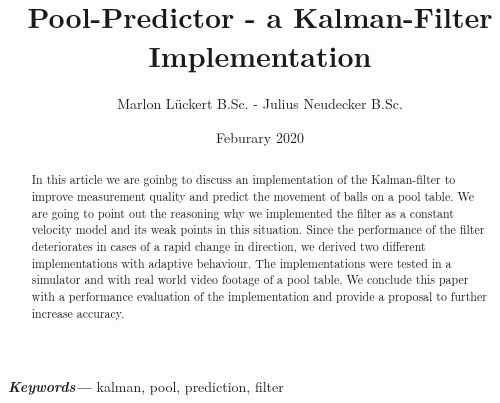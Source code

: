 \documentclass[notitlepage, a4paper, 11pt]{scrartcl}
\providecommand{\keywords}[1]
{
  \small	
  \textbf{\textit{Keywords---}} #1
}
\begin{document}
\title{Pool-Predictor - a Kalman-Filter Implementation}
\author{Marlon Lückert B.Sc. - Julius Neudecker B.Sc.}
\date{Feburary 2020}

\maketitle

\begin{abstract}
In this article we are goinbg to discuss an implementation of the Kalman-filter \cite{kalman} to improve measurement quality and predict the movement of balls on a pool table. 
We are going to point out the reasoning why we implemented the filter as a constant velocity model and its weak points in this situation.
Since the performance of the filter deteriorates in cases of a rapid change in direction, we derived two different implementations with adaptive behaviour.
The implementations were tested in a simulator and with real world video footage of a pool table.
We conclude this paper with a performance evaluation of the implementation and provide a proposal to further increase accuracy.

\end{abstract}

\keywords{kalman, pool, prediction, filter}
\end{document}
